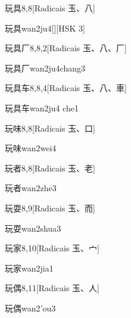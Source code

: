 \begin{entry}{玩具}{8,8}[Radicais ⽟、⼋]
  \begin{phonetics}{玩具}{wan2ju4}[][HSK 3]
  \end{phonetics}
\end{entry}

\begin{entry}{玩具厂}{8,8,2}[Radicais ⽟、⼋、⼚]
  \begin{phonetics}{玩具厂}{wan2ju4chang3}
  \end{phonetics}
\end{entry}

\begin{entry}{玩具车}{8,8,4}[Radicais ⽟、⼋、⾞]
  \begin{phonetics}{玩具车}{wan2ju4 che1}
  \end{phonetics}
\end{entry}

\begin{entry}{玩味}{8,8}[Radicais ⽟、⼝]
  \begin{phonetics}{玩味}{wan2wei4}
  \end{phonetics}
\end{entry}

\begin{entry}{玩者}{8,8}[Radicais ⽟、⽼]
  \begin{phonetics}{玩者}{wan2zhe3}
  \end{phonetics}
\end{entry}

\begin{entry}{玩耍}{8,9}[Radicais ⽟、⽽]
  \begin{phonetics}{玩耍}{wan2shua3}
  \end{phonetics}
\end{entry}

\begin{entry}{玩家}{8,10}[Radicais ⽟、⼧]
  \begin{phonetics}{玩家}{wan2jia1}
  \end{phonetics}
\end{entry}

\begin{entry}{玩偶}{8,11}[Radicais ⽟、⼈]
  \begin{phonetics}{玩偶}{wan2'ou3}
  \end{phonetics}
\end{entry}

